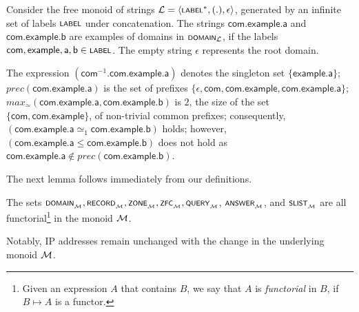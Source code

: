 \begin{example}\label{ex:normal-domain}
	Consider the free monoid of strings $\cal L = \tup{\scrsf{label}^*,(.),\epsilon}$, generated by an infinite set of labels $\scrsf{label}$ under concatenation. The strings $\mathsf{com.example.a}$ and $\mathsf{com.example.b}$ are examples of domains in $\scrsf{domain}_{\cal L}$, if the labels $\mathsf{com,example,a,b}\in \scrsf{label}$. The empty string $\epsilon$ represents the root domain. 
	
	The expression $(\mathsf{com}^{-1}.\mathsf{com.example.a})$ denotes the singleton set $\{\mathsf{example.a}\}$; $prec(\mathsf{com.example.a})$ is the set of prefixes $\{\epsilon, \mathsf{com,com.example,com.example.a}\}$; $max_{\simeq}(\mathsf{com.example.a},\mathsf{com.example.b})$ is $2$, the size of the set $\{\mathsf{com,com.example}\}$, of non-trivial common prefixes; consequently, $(\mathsf{com.example.a}\simeq_{1}\mathsf{com.example.b})$ holds; however, $(\mathsf{com.example.a}\leq\mathsf{com.example.b})$ does not hold as $\mathsf{com.example.a}\not\in prec(\mathsf{com.example.b})$.
\end{example}

The next lemma follows immediately from our definitions.

\begin{lemma}\label{lem:notation-functorial}
	The sets $\scrsf{domain}\subsub{\monoid},\scrsf{record}\subsub{\monoid},\scrsf{zone}\subsub{\monoid}, \scrsf{zfc}\subsub{\monoid}, \scrsf{query}\subsub{\monoid}$, $\scrsf{answer}\subsub{\monoid}$, and $\scrsf{slist}\subsub{\monoid}$ are all functorial\footnote{Given an expression $A$ that contains $B$, we say that $A$ is \emph{functorial} in $B$, if $B \mapsto A$ is a functor.} in the monoid $\mathcal M$.
\end{lemma}

Notably, IP addresses remain unchanged with the change in the underlying monoid $\mathcal M$.

